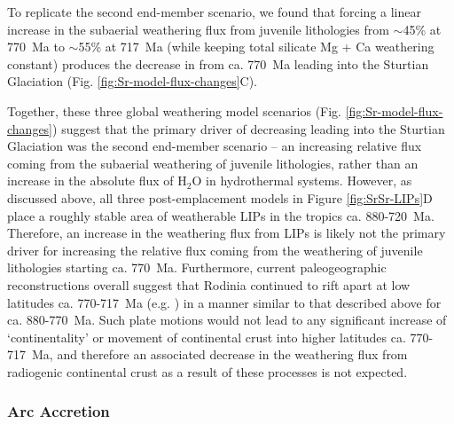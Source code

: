 To replicate the second end-member scenario, we found that forcing a linear increase in the subaerial weathering flux from juvenile lithologies from $\sim$45\% at 770~Ma to $\sim$55\% at 717~Ma (while keeping total silicate Mg + Ca weathering constant) produces the decrease in \SrSr from ca. 770~Ma leading into the Sturtian Glaciation (Fig. \ref{fig:Sr-model-flux-changes}C).

Together, these three global weathering model scenarios (Fig. \ref{fig:Sr-model-flux-changes}) suggest that the primary driver of decreasing \SrSr leading into the Sturtian Glaciation was the second end-member scenario -- an increasing relative flux coming from the subaerial weathering of juvenile lithologies, rather than an increase in the absolute flux of H$_{2}$O in hydrothermal systems. However, as discussed above, all three post-emplacement models in Figure \ref{fig:SrSr-LIPs}D place a roughly stable area of weatherable LIPs in the tropics ca. 880-720~Ma. Therefore, an increase in the weathering flux from LIPs is likely not the primary driver for increasing the relative flux coming from the weathering of juvenile lithologies starting ca. 770~Ma. Furthermore, current paleogeographic reconstructions overall suggest that Rodinia continued to rift apart at low latitudes ca. 770-717~Ma (e.g. \citealp{Li2008a}) in a manner similar to that described above for ca. 880-770~Ma. Such plate motions would not lead to any significant increase of `continentality' or movement of continental crust into higher latitudes ca. 770-717~Ma, and therefore an associated decrease in the weathering flux from radiogenic continental crust as a result of these processes is not expected.

\subsubsection{Arc Accretion}


